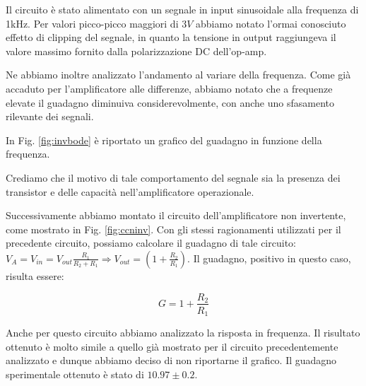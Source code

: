 Il circuito è stato alimentato con un segnale in input sinusoidale alla frequenza di 1kHz.
Per valori picco-picco maggiori di $3V$ abbiamo notato l'ormai conosciuto effetto di clipping del segnale, in quanto la tensione in output raggiungeva il valore massimo fornito dalla polarizzazione DC dell'op-amp. 

Ne abbiamo inoltre analizzato l'andamento al variare della frequenza.
Come già accaduto per l'amplificatore alle differenze, abbiamo notato che a frequenze elevate il guadagno diminuiva considerevolmente, con anche uno sfasamento rilevante dei segnali.

In Fig. \ref{fig:invbode} è riportato un grafico del guadagno in funzione della frequenza. 

Crediamo che il motivo di tale comportamento %
del segnale sia la presenza dei transistor e delle capacità nell'amplificatore operazionale.

Successivamente abbiamo montato il circuito dell'amplificatore non invertente, come mostrato in Fig. \ref{fig:ccninv}. Con gli stessi ragionamenti utilizzati per il precedente circuito, possiamo calcolare il guadagno di tale circuito: $V_A=V_{in}=V_{out}\frac{R_1}{R_2+R_1} \Rightarrow V_{out}=(1+\frac{R_2}{R_1})$. Il guadagno, positivo in questo caso, risulta essere: 

\begin{equation}
G=1+\frac{R_2}{R_1}
\end{equation}

Anche per questo circuito abbiamo analizzato la risposta in frequenza.
Il risultato ottenuto è molto simile a quello già mostrato per il circuito precedentemente analizzato e dunque abbiamo deciso di non riportarne il grafico. Il guadagno sperimentale ottenuto è stato di $10.97 \pm 0.2$.
